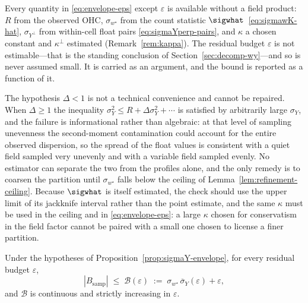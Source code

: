 Every quantity in \eqref{eq:envelope-eps} except $\varepsilon$ is
available without a field product: $R$ from the observed OHC,
$\sigma_{w^{\star}}$ from the count statistic
$\sigwhat$~\eqref{eq:sigmawK-hat}, $\sigma_{Y^{\perp}}$ from within-cell
float pairs \eqref{eq:sigmaYperp-pairs}, and
$\kappa$ a chosen constant and $\kappa^{\perp}$ estimated
(Remark~\ref{rem:kappa}). The residual budget $\varepsilon$ is not
estimable---that is the standing conclusion of
Section~\ref{sec:decomp-wy}---and so is never assumed small. It is
carried as an argument, and the bound is reported as a function of it.

\begin{remark}
\label{rem:delta-fails}
The hypothesis $\Delta<1$ is not a technical convenience and cannot be
repaired. When $\Delta\ge1$ the inequality
$\sigma_Y^2\le R+\Delta\sigma_Y^2+\cdots$ is satisfied by arbitrarily
large $\sigma_Y$, and the failure is informational rather than
algebraic: at that level of sampling unevenness the second-moment
contamination could account for the entire observed dispersion, so the
spread of the float values is consistent with a quiet field sampled very
unevenly and with a variable field sampled evenly. No estimator can
separate the two from the profiles alone, and the only remedy is to
coarsen the partition until $\sigma_{w^{\star}}$ falls below the ceiling
of Lemma~\ref{lem:refinement-ceiling}. Because $\sigwhat$ is itself
estimated, the check should use the upper limit of its jackknife interval
rather than the point estimate, and the same $\kappa$ must be used in the
ceiling and in \eqref{eq:envelope-eps}: a large $\kappa$ chosen for
conservatism in the field factor cannot be paired with a small one chosen
to license a finer partition.
\end{remark}

\begin{corollary}
\label{cor:field-free}
Under the hypotheses of Proposition~\ref{prop:sigmaY-envelope}, for every
residual budget $\varepsilon$,
\begin{equation}
  |B_{\mathrm{samp}}|
  \;\le\;\mathcal{B}(\varepsilon)
  \;:=\;\sigma_{w^{\star}}\,\overline{\sigma}_Y(\varepsilon)
        +\varepsilon ,
  \label{eq:bias-eps}
\end{equation}
and $\mathcal{B}$ is continuous and strictly increasing in $\varepsilon$.
\end{corollary}

